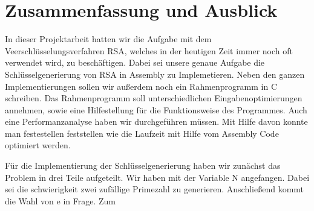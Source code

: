 \documentclass[course=asp]{aspdoc}
\begin{document}
\section{Zusammenfassung und Ausblick}
In dieser Projektarbeit hatten wir die Aufgabe mit dem Veerschlüsselungsverfahren RSA, welches in der heutigen Zeit immer noch oft verwendet wird, zu beschäftigen. Dabei sei unsere genaue Aufgabe die Schlüsselgenerierung von RSA in Assembly zu Implemetieren. Neben den ganzen Implementierungen sollen wir außerdem noch ein Rahmenprogramm in C schreiben. Das Rahmenprogramm soll unterschiedlichen Eingabenoptimierungen annehmen, sowie eine Hilfestellung für die Funktionsweise des Programmes. Auch eine Performanzanalyse haben wir durchgeführen müssen. Mit Hilfe davon konnte man festestellen feststellen wie die Laufzeit mit Hilfe vom Assembly Code optimiert werden. 

Für die Implementierung der Schlüsselgenerierung haben wir zunächst das Problem in drei Teile aufgeteilt. Wir haben mit der Variable N angefangen. Dabei sei die schwierigkeit zwei zufällige Primezahl zu generieren. Anschließend kommt die Wahl von e in Frage. Zum     



{}
\end{document}
